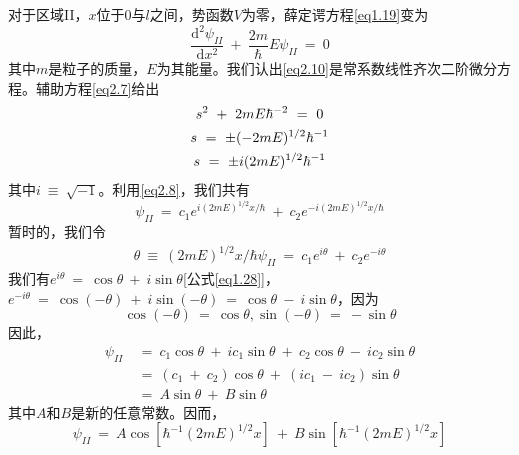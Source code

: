 \documentclass[12pt,a4paper,openany]{ctexbook}
\begin{document}
\begin{flushleft}
对于区域II，$x$位于0与$l$之间，势函数$V$为零，薛定谔方程\eqref{eq1.19}变为
\begin{equation}
    \frac{\mathrm{d}^2\psi_{II}}{\mathrm{d}x^2}\ +\ \frac{2m}{\hbar}E\psi_{II}\ =\ 0
    \label{eq2.10}
\end{equation}
其中$m$是粒子的质量，$E$为其能量。我们认出\eqref{eq2.10}是常系数线性齐次二阶微分方程。辅助方程\eqref{eq2.7}给出
\begin{gather}
    s^2\ +\ 2mE\hbar^{-2}\ =\ 0 \notag \\
    s\ =\ \pm(-2mE)^{1/2}\hbar^{-1} \label{eq2.11}\\
    s\ =\ \pm i(2mE)^{1/2}\hbar^{-1} \label{eq2.12}
\end{gather}
其中$i\ \equiv\ \sqrt{-1}$。利用\eqref{eq2.8}，我们共有
\begin{equation}
    \psi_{II}\ =\ c_1e^{i(2mE)^{1/2}x/\hbar}\ +\ c_2e^{-i(2mE)^{1/2}x/\hbar}
    \label{eq2.13}
\end{equation}
暂时的，我们令
\begin{gather*}
    \theta\ \equiv\ (2mE)^{1/2}x/\hbar
    \psi_{II}\ =\ c_1e^{i\theta}\ +\ c_2e^{-i\theta}
\end{gather*}
我们有$e^{i\theta}\ =\ \cos\theta\ +\ i\sin\theta$[公式\eqref{eq1.28}]，$e^{-i\theta}\ =\ \cos(-\theta)\ +\ i\sin(-\theta)\ =\ \cos\theta\ -\ i\sin\theta$，因为
\begin{equation}
    \boxed{\cos(-\theta)\ =\ \cos\theta,\sin(-\theta)\ =\ -\sin\theta}
\end{equation}
因此，
\begin{align*}
    \psi_{II}\ &=\ c_1\cos\theta\ +\ ic_1\sin\theta\ +\ c_2\cos\theta\ -\ ic_2\sin\theta \\
    &=\ (c_1\ +\ c_2)\cos\theta\ +\ (ic_1\ -\ ic_2)\sin\theta \\
    &=\ A\sin\theta\ +\ B\sin\theta
\end{align*}
其中$A$和$B$是新的任意常数。因而，
\begin{equation}
    \psi_{II}\ =\ A\cos[\hbar^{-1}(2mE)^{1/2}x]\ +\ B\sin[\hbar^{-1}(2mE)^{1/2}x]
    \label{eq2.15}
\end{equation}


\end{flushleft}
\end{document}
